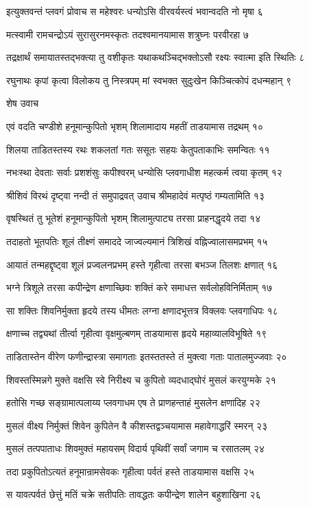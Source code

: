 इत्युक्तवन्तं प्लवगं प्रोवाच स महेश्वरः
धन्योऽसि वीरवर्यस्त्वं भवान्वदति नो मृषा ६

मत्स्वामी रामचन्द्रोऽयं सुरासुरनमस्कृतः
तदश्वमानयामास शत्रुघ्नः परवीरहा ७

तद्रक्षार्थं समायातस्तद्भक्त्या तु वशीकृतः
यथाकथञ्चिद्भक्तोऽसौ रक्ष्यः स्वात्मा इति स्थितिः ८

रघुनाथः कृपां कृत्वा विलोकय तु निस्त्रपम्
मां स्वभक्त सुदुःखेन किञ्चित्कोपं दधन्महान् ९

शेष उवाच

एवं वदति चण्डीशे हनूमान्कुपितो भृशम्
शिलामादाय महतीं ताडयामास तद्रथम् १०

शिलया ताडितस्तस्य रथः शकलतां गतः
ससूतः सहयः केतुपताकाभिः समन्वितः ११

नभःस्था देवताः सर्वाः प्रशशंसुः कपीश्वरम्
धन्योसि प्लवगाधीश महत्कर्म त्वया कृतम् १२

श्रीशिवं विरथं दृष्ट्वा नन्दी तं समुपाद्रवत्
उवाच श्रीमहादेवं मत्पृष्ठं गम्यतामिति १३

वृषस्थितं तु भूतेशं हनूमान्कुपितो भृशम्
शिलामुत्पाट्य तरसा प्राहनद्धृदये तदा १४

तदाहतो भूतपतिः शूलं तीक्ष्णं समाददे
जाज्वल्यमानं त्रिशिखं वह्निज्वालासमप्रभम् १५

आयातं तन्महद्दृष्ट्वा शूलं प्रज्वलनप्रभम्
हस्ते गृहीत्वा तरसा बभञ्ज तिलशः क्षणात् १६

भग्ने त्रिशूले तरसा कपीन्द्रेण क्षणाच्छिवः
शक्तिं करे समाधत्त सर्वलोहविनिर्मिताम् १७

सा शक्तिः शिवनिर्मुक्ता हृदये तस्य धीमतः
लग्ना क्षणादभूत्तत्र विक्लवः प्लवगाधिपः १८

क्षणाच्च तद्व्यथां तीर्त्वा गृहीत्वा वृक्षमुल्बणम्
ताडयामास हृदये महाव्यालविभूषिते १९

ताडितास्तेन वीरेण फणीन्द्रास्त्रा समागताः
इतस्ततस्ते तं मुक्त्वा गताः पातालमुज्जवाः २०

शिवस्तस्मिन्नगे मुक्ते वक्षसि स्वे निरीक्ष्य च
कुपितो व्यदधाद्घोरं मुसलं करयुग्मके २१

हतोसि गच्छ सङ्ग्रामात्पलाय्य प्लवगाधम
एष ते प्राणहन्ताहं मुसलेन क्षणादिह २२

मुसलं वीक्ष्य निर्मुक्तं शिवेन कुपितेन वै
कीशस्तद्वञ्चयामास महावेगाद्धरिं स्मरन् २३

मुसलं तत्पपाताधः शिवमुक्तं महायसम्
विदार्य पृथिवीं सर्वां जगाम च रसातलम् २४

तदा प्रकुपितोऽत्यतं हनूमान्रामसेवकः
गृहीत्वा पर्वतं हस्ते ताडयामास वक्षसि २५

स यावत्पर्वतं छेत्तुं मतिं चक्रे सतीपतिः
तावद्धतः कपीन्द्रेण शालेन बहुशाखिना २६

